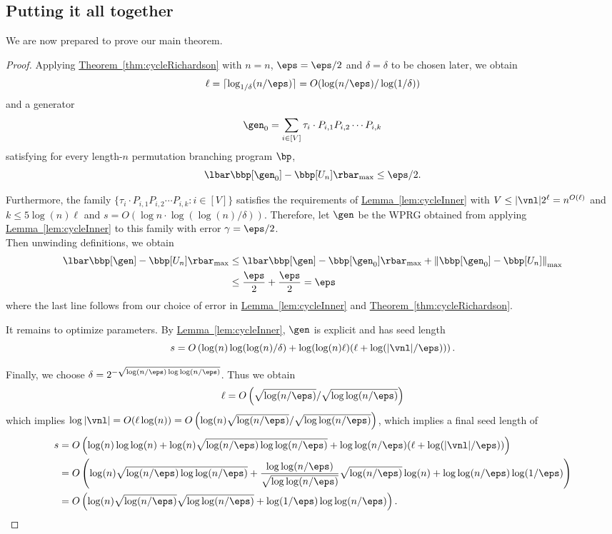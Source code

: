 \documentclass[11pt]{article}
\newcommand{\expref}[2]{\texorpdfstring{\hyperref[#2]{#1~\ref{#2}}}{#1~\ref{#2}}}
\begin{document}
\subsection{Putting it all together}
We are now prepared to prove our main theorem.
\cycleMatrix*
\begin{proof}
Applying \expref{Theorem}{thm:cycleRichardson} with $n=n$, $\eps=\eps/2$ and $\delta=\delta$ to be chosen later, we obtain 
$$\ell=\lceil \log_{1/\delta}(n/\eps)\rceil = O(\log(n/\eps)/\log(1/\delta))$$ 
and a generator
\[\gen_0 = \sum_{i\in [V]}\tau_i\cdot P_{i,1}P_{i,2}\cdots P_{i,k}\]
satisfying for every length-$n$ permutation branching program $\bp$,
$$\lbar\bbp[\gen_0] - \bbp[U_n]\rbar_{\max}\leq \eps/2.$$

Furthermore, the family $\{\tau_i\cdot P_{i,1}P_{i,2}\cdots P_{i,k}:i\in [V]\}$ satisfies the requirements of \expref{Lemma}{lem:cycleInner} with $V\leq |\vnl|2^\ell=n^{O(\ell)}$ and $k\leq 5\log(n)\ell$ and $s=O(\log n\cdot\log(\log(n)/\delta))$. Therefore, let $\gen$ be the WPRG obtained from applying \expref{Lemma}{lem:cycleInner} to this family with error $\gamma=\eps/2$.\\

Then unwinding definitions, we obtain
\begin{align*}
    \lbar\bbp[\gen]-\bbp[U_n]\rbar_{\max} &\leq \lbar\bbp[\gen]- \bbp[\gen_0]\rbar_{\max}+ \left\|\bbp[\gen_0] - \bbp[U_n]\right\|_{\max}\\
    &\leq \frac{\eps}{2}+\frac{\eps}{2} = \eps
\end{align*}
where the last line follows from our choice of error in \expref{Lemma}{lem:cycleInner} and \expref{Theorem}{thm:cycleRichardson}.

It remains to optimize parameters. By \expref{Lemma}{lem:cycleInner}, $\gen$ is explicit and has seed length
\[s=O\left(\log(n)\log(\log(n)/\delta) + \log(\log(n)\ell)(\ell+\log(|\vnl|/\eps))\right).\]

Finally, we choose $\delta=2^{-\sqrt{\log(n/\eps)\log\log(n/\eps)}}$. Thus we obtain 
$$\ell=O\left(\sqrt{\log(n/\eps)}/\sqrt{\log\log(n/\eps)}\right)$$
which implies $\log|\vnl|=O(\ell\log(n))=O\left(\log(n)\sqrt{\log(n/\eps)}/\sqrt{\log\log(n/\eps)}\right)$, which implies a final seed length of
\begin{align*}
    s &= O\left(\log(n)\log\log(n) +\log(n)\sqrt{\log(n/\eps)\log\log(n/\eps)} + \log\log(n/\eps)(\ell+\log(|\vnl|/\eps))\right)\\
    &= O\left(\log(n)\sqrt{\log(n/\eps)\log\log(n/\eps)} + \frac{\log\log(n/\eps)}{\sqrt{\log\log(n/\eps)}}\sqrt{\log(n/\eps)}\log(n)+\log\log(n/\eps)\log(1/\eps)\right)\\
    &= O\left(\log(n)\sqrt{\log(n/\eps)}\sqrt{\log\log(n/\eps)}+ \log(1/\eps)\log\log(n/\eps)\right). \qedhere
\end{align*}
\end{proof}
\end{document}
